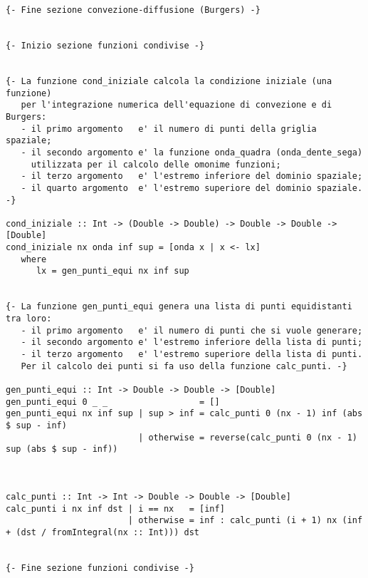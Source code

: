 \begin{verbatim}
{- Fine sezione convezione-diffusione (Burgers) -}


{- Inizio sezione funzioni condivise -}


{- La funzione cond_iniziale calcola la condizione iniziale (una funzione)
   per l'integrazione numerica dell'equazione di convezione e di Burgers:
   - il primo argomento   e' il numero di punti della griglia spaziale;
   - il secondo argomento e' la funzione onda_quadra (onda_dente_sega) 
     utilizzata per il calcolo delle omonime funzioni;
   - il terzo argomento   e' l'estremo inferiore del dominio spaziale;
   - il quarto argomento  e' l'estremo superiore del dominio spaziale. -}

cond_iniziale :: Int -> (Double -> Double) -> Double -> Double -> [Double]
cond_iniziale nx onda inf sup = [onda x | x <- lx]
   where
      lx = gen_punti_equi nx inf sup


{- La funzione gen_punti_equi genera una lista di punti equidistanti tra loro:
   - il primo argomento   e' il numero di punti che si vuole generare;
   - il secondo argomento e' l'estremo inferiore della lista di punti;
   - il terzo argomento   e' l'estremo superiore della lista di punti.
   Per il calcolo dei punti si fa uso della funzione calc_punti. -}

gen_punti_equi :: Int -> Double -> Double -> [Double]
gen_punti_equi 0 _ _                  = []
gen_punti_equi nx inf sup | sup > inf = calc_punti 0 (nx - 1) inf (abs $ sup - inf) 
                          | otherwise = reverse(calc_punti 0 (nx - 1) sup (abs $ sup - inf))



calc_punti :: Int -> Int -> Double -> Double -> [Double]
calc_punti i nx inf dst | i == nx   = [inf]
                        | otherwise = inf : calc_punti (i + 1) nx (inf + (dst / fromIntegral(nx :: Int))) dst


{- Fine sezione funzioni condivise -}

\end{verbatim}